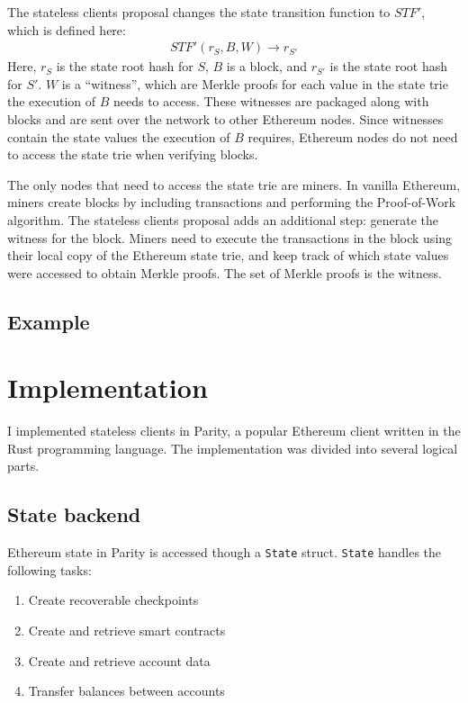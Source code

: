 \documentclass[12pt]{article}
\begin{document}
The stateless clients proposal changes the state transition function to $STF'$, which is defined here:
\begin{align*}
  STF'(r_S, B, W) \to r_{S'}
\end{align*}
Here, $r_S$ is the state root hash for $S$, $B$ is a block, and $r_{S'}$ is the state root hash for $S'$. $W$ is a ``witness'', which are Merkle proofs for each value in the state trie the execution of $B$ needs to access. These witnesses are packaged along with blocks and are sent over the network to other Ethereum nodes. Since witnesses contain the state values the execution of $B$ requires, Ethereum nodes do not need to access the state trie when verifying blocks.

The only nodes that need to access the state trie are miners. In vanilla Ethereum, miners create blocks by including transactions and performing the Proof-of-Work algorithm. The stateless clients proposal adds an additional step: generate the witness for the block. Miners need to execute the transactions in the block using their local copy of the Ethereum state trie, and keep track of which state values were accessed to obtain Merkle proofs. The set of Merkle proofs is the witness.

\subsection{Example}



\section{Implementation}

I implemented stateless clients in Parity, a popular Ethereum client written in the Rust programming language. The implementation was divided into several logical parts.

\subsection{State backend}

Ethereum state in Parity is accessed though a \texttt{State} struct. \texttt{State} handles the following tasks:
\begin{enumerate}
  \item Create recoverable checkpoints
  \item Create and retrieve smart contracts
  \item Create and retrieve account data
  \item Transfer balances between accounts
\end{enumerate}
\end{document}
